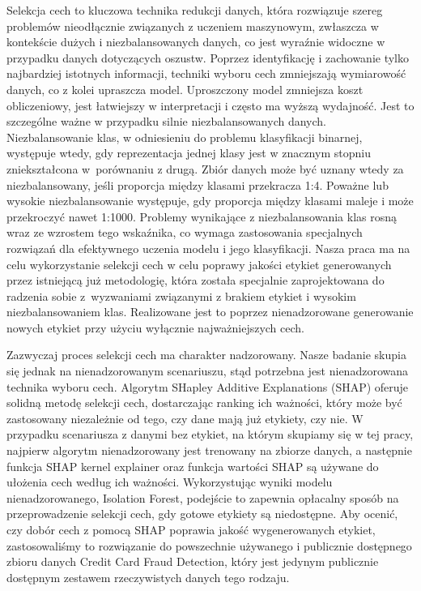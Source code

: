 \documentclass [runningheads]{llncs}
\begin{document}
Selekcja cech to kluczowa technika redukcji danych, która rozwiązuje szereg problemów nieodłącznie związanych z uczeniem maszynowym,
zwłaszcza w kontekście dużych i niezbalansowanych danych, co jest wyraźnie widoczne w przypadku danych dotyczących oszustw.
Poprzez identyfikację i zachowanie tylko najbardziej istotnych informacji, techniki wyboru cech zmniejszają wymiarowość danych, co z kolei upraszcza model.
Uproszczony model zmniejsza koszt obliczeniowy, jest łatwiejszy w interpretacji i często ma wyższą wydajność.
Jest to szczególne ważne w przypadku silnie niezbalansowanych danych.
Niezbalansowanie klas, w odniesieniu do problemu klasyfikacji binarnej, występuje wtedy, gdy reprezentacja jednej
klasy jest w znacznym stopniu zniekształcona w~porównaniu z drugą. Zbiór danych może być uznany wtedy za niezbalansowany,
jeśli proporcja między klasami przekracza 1:4. Poważne lub wysokie niezbalansowanie występuje, gdy proporcja między klasami
maleje i może przekroczyć nawet 1:1000\cite{url-inbalanced-datasets}. Problemy wynikające z niezbalansowania klas rosną wraz ze wzrostem tego wskaźnika,
co wymaga zastosowania specjalnych rozwiązań dla efektywnego uczenia modelu i jego klasyfikacji.
Nasza praca ma na celu wykorzystanie selekcji cech w celu poprawy jakości etykiet generowanych przez istniejącą już metodologię,
która została specjalnie zaprojektowana do radzenia sobie z~wyzwaniami związanymi z brakiem etykiet i wysokim niezbalansowaniem klas.
Realizowane jest to poprzez nienadzorowane generowanie nowych etykiet przy użyciu wyłącznie najważniejszych cech.

Zazwyczaj proces selekcji cech ma charakter nadzorowany. Nasze badanie skupia się jednak na nienadzorowanym scenariuszu,
stąd potrzebna jest nienadzorowana technika wyboru cech. Algorytm SHapley Additive Explanations (SHAP)\cite{url-SHAP} oferuje solidną metodę
selekcji cech, dostarczając ranking ich ważności, który może być zastosowany niezależnie od tego, czy dane mają już etykiety, czy nie.
W przypadku scenariusza z danymi bez etykiet, na którym skupiamy się w tej pracy, najpierw algorytm nienadzorowany jest
trenowany na zbiorze danych, a następnie funkcja SHAP kernel explainer\cite{url-kernel-explainer} oraz funkcja wartości SHAP są używane do ułożenia cech
według ich ważności. Wykorzystując wyniki modelu nienadzorowanego\cite{article-unsupervised-learning}, Isolation Forest\cite{url-IF}, podejście to zapewnia opłacalny
sposób na przeprowadzenie selekcji cech, gdy gotowe etykiety są niedostępne.
Aby ocenić, czy dobór cech z pomocą SHAP poprawia jakość wygenerowanych etykiet, zastosowaliśmy to rozwiązanie do
powszechnie używanego i publicznie dostępnego zbioru danych Credit Card Fraud Detection\cite{url-kaggle-dataset}, który jest jedynym publicznie
dostępnym zestawem rzeczywistych danych tego rodzaju.
\end{document}
